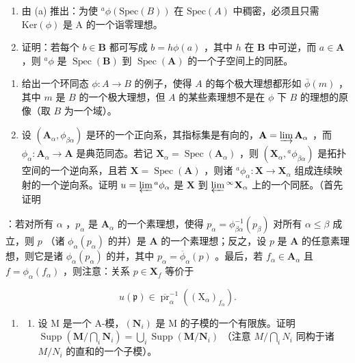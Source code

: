 \begin{enumerate}
\def\labelenumi{(\alph{enumi})}
\setcounter{enumi}{1}
\item
  由 (a) 推出：为使 \(^{a}\phi(\text{Spec}(B))\) 在 \(\text{Spec}(A)\) 中稠密，必须且只需 \(\text{Ker}(\phi)\) 是 A 的一个诣零理想。
\item
  证明：若每个 \(b \in \mathbf{B}\) 都可写成 \(b = h\phi(a)\) ，其中 \(h\) 在 \(\mathbf{B}\) 中可逆，而 \(a \in \mathbf{A}\) ，则 \(^a\phi\) 是 \(\operatorname{Spec}(\mathbf{B})\) 到 \(\operatorname{Spec}(\mathbf{A})\) 的一个子空间上的同胚。
\end{enumerate}

\begin{enumerate}
\def\labelenumi{\arabic{enumi}.}
\setcounter{enumi}{19}
\item
  给出一个环同态 \(\phi: A \to B\) 的例子，使得 \(A\) 的每个极大理想都形如 \(\bar{\phi}(m)\) ，其中 \(m\) 是 \(B\) 的一个极大理想，但 \(A\) 的某些素理想不是在 \(\phi\) 下 \(B\) 的理想的原像（取 \(B\) 为一个域）。
\item
  设 \((\mathbf{A}_{\alpha}, \phi_{\beta \alpha})\) 是环的一个正向系，其指标集是有向的，\(\mathbf{A} = \varinjlim \mathbf{A}_{\alpha}\) ，而 \(\phi_{\alpha}: \mathbf{A}_{\alpha} \to \mathbf{A}\) 是典范同态。若记 \(\mathbf{X}_{\alpha} = \operatorname{Spec}(\mathbf{A}_{\alpha})\) ，则 \((\mathbf{X}_{\alpha}, {}^{a}\phi_{\beta \alpha})\) 是拓扑空间的一个逆向系，且若 \(\mathbf{X} = \operatorname{Spec}(\mathbf{A})\) ，则诸 \({}^{a}\phi_{\alpha}: \mathbf{X} \to \mathbf{X}_{\alpha}\) 组成连续映射的一个逆向系。证明 \(u = \varprojlim {}^{a}\phi_{\alpha}\) 是 \(\mathbf{X}\) 到 \(\varprojlim {}^{\infty}\mathbf{X}_{\alpha}\) 上的一个同胚。（首先证明
\end{enumerate}

：若对所有 \(\alpha\) ，\(p_{\alpha}\) 是 \(\mathbf{A}_{\alpha}\) 的一个素理想，使得 \(p_{\alpha} = \phi_{\beta \alpha}^{-1}(p_{\beta})\) 对所有 \(\alpha \leqslant \beta\) 成立，则 \(p\) （诸 \(\phi_{\alpha}(p_{\alpha})\) 的并）是 \(\mathbf{A}\) 的一个素理想；反之，设 \(p\) 是 \(\mathbf{A}\) 的任意素理想，则它是诸 \(\phi_{\alpha}(p_{\alpha})\) 的并，其中 \(p_{\alpha} = \overline{\phi}_{\alpha}(p)\) 。最后，若 \(f_{\alpha} \in \mathbf{A}_{\alpha}\) 且 \(f = \phi_{\alpha}(f_{\alpha})\) ，则注意：关系 \(p \in \mathbf{X}_f\) 等价于

\[
u (\mathfrak {p}) \in \overline {{\operatorname{pr}}} _ {\alpha} ^ {- 1} ((\mathrm{X} _ {\alpha}) _ {f _ {\alpha}}).
\]

\begin{enumerate}
\def\labelenumi{\arabic{enumi}.}
\setcounter{enumi}{21}
\tightlist
\item
  \begin{enumerate}
  \def\labelenumii{(\alph{enumii})}
  \tightlist
  \item
    设 M 是一个 A-模，\((\mathbf{N}_{i})\) 是 M 的子模的一个有限族。证明 \(\operatorname{Supp}\left(\mathbf{M}/\bigcap_{i}\mathbf{N}_{i}\right)=\bigcup_{i}\operatorname{Supp}(\mathbf{M}/\mathbf{N}_{i})\) （注意 \(M/\bigcap_{i}N_{i}\) 同构于诸 \(M/N_{i}\) 的直和的一个子模）。
  \end{enumerate}
\end{enumerate}

